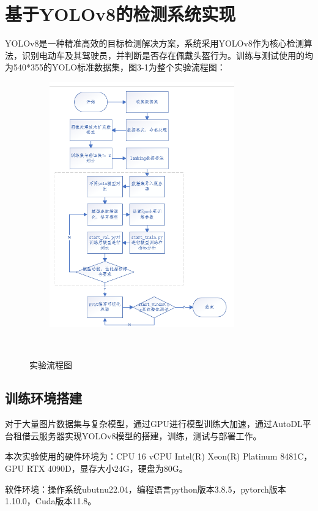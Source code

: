 \documentclass[journal]{IEEEtran}
\begin{document}
\section{基于YOLOv8的检测系统实现}
YOLOv8是一种精准高效的目标检测解决方案，系统采用YOLOv8作为核心检测算法，识别电动车及其驾驶员，并判断是否存在佩戴头盔行为。训练与测试使用的均为540*355的YOLO标准数据集，图3-1为整个实验流程图：
\begin{figure}[htbp] 

   \centering
   \includegraphics[width=8cm]{figures/流程图.png}
   \caption{实验流程图} 
   \label{fig:} 
  
\end{figure} 

\subsection{训练环境搭建}
对于大量图片数据集与复杂模型，通过GPU进行模型训练大加速，通过AutoDL平台租借云服务器实现YOLOv8模型的搭建，训练，测试与部署工作。\par
本次实验使用的硬件环境为：CPU 16 vCPU Intel(R) Xeon(R) Platinum 8481C，GPU RTX 4090D，显存大小24G，硬盘为80G。\par
软件环境：操作系统ubutnu22.04，编程语言python版本3.8.5，pytorch版本1.10.0，Cuda版本11.8。\par

\end{document}
